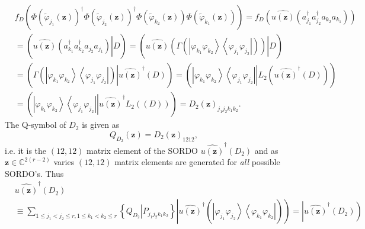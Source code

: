 \documentclass[aps,preprint]{revtex4}%
\begin{document}
\begin{align}
&  f_{D}\left(  \Phi\left(  \tilde{\varphi}_{j_{1}}\left(  \mathbf{z}\right)
\right)  ^{\dagger}\Phi\left(  \tilde{\varphi}_{j_{2}}\left(  \mathbf{z}%
\right)  \right)  ^{\dagger}\Phi\left(  \tilde{\varphi}_{k_{2}}\left(
\mathbf{z}\right)  \right)  \Phi\left(  \tilde{\varphi}_{k_{1}}\left(
\mathbf{z}\right)  \right)  \right)  =f_{D}\left(  \widehat{u\left(
\mathbf{z}\right)  }\left(  a_{j_{1}}^{\dagger}a_{j_{2}}^{\dagger}a_{k_{2}%
}a_{k_{1}}\right)  \right) \nonumber\\
&  =\left(  \left.  \overset{}{\widehat{u\left(  \mathbf{z}\right)  }\left(
a_{k_{1}}^{\dagger}a_{k_{2}}^{\dagger}a_{j_{2}}a_{j_{1}}\right)  }\right\vert
D\right)  =\left(  \left.  \overset{}{\widehat{u\left(  \mathbf{z}\right)
}\left(  \Gamma\left(  \left\vert \varphi_{k_{1}}\varphi_{k_{2}}\right\rangle
\left\langle \varphi_{j_{1}}\varphi_{j_{2}}\right\vert \right)  \right)
}\right\vert D\right) \nonumber\\
&  =\left(  \left.  \overset{}{\Gamma\left(  \left\vert \varphi_{k_{1}}%
\varphi_{k_{2}}\right\rangle \left\langle \varphi_{j_{1}}\varphi_{j_{2}%
}\right\vert \right)  }\right\vert \widehat{u\left(  \mathbf{z}\right)
}^{\dagger}\left(  D\right)  \right)  =\left(  \left.  \overset{}{\left\vert
\varphi_{k_{1}}\varphi_{k_{2}}\right\rangle \left\langle \varphi_{j_{1}%
}\varphi_{j_{2}}\right\vert }\right\vert L_{2}\left(  \widehat{u\left(
\mathbf{z}\right)  }^{\dagger}\left(  D\right)  \right)  \right) \nonumber\\
&  =\left(  \left.  \overset{}{\left\vert \varphi_{k_{1}}\varphi_{k_{2}%
}\right\rangle \left\langle \varphi_{j_{1}}\varphi_{j_{2}}\right\vert
}\right\vert \widehat{u\left(  \mathbf{z}\right)  }^{\dagger}L_{2}\left(
\left(  D\right)  \right)  \right)  =D_{2}\left(  \mathbf{z}\right)
_{j_{1}j_{2}k_{1}k_{2}}.
\end{align}
The Q-symbol of $D_{2}$ is given as
\begin{equation}
Q_{D_{2}}\left(  \mathbf{z}\right)  =D_{2}\left(  \mathbf{z}\right)  _{1212},
\end{equation}
i.e. it is the $\left(  12,12\right)  $ matrix element of the SORDO
$\widehat{u\left(  \mathbf{z}\right)  }^{\dagger}\left(  D_{2}\right)  $ and
as $\mathbf{z\in}\mathbb{C}^{2\left(  r-2\right)  }$ varies $\left(
12,12\right)  $ matrix elements are generated for \emph{all }possible SORDO's.
Thus
\begin{align}
&  \widehat{u\left(  \mathbf{z}\right)  }^{\dagger}\left(  D_{2}\right)
\nonumber\\
&  \equiv\sum_{1\leq j_{1}<j_{2}\leq r,1\leq k_{1}<k_{2}\leq r}\left\{
\left.  \overset{}{Q_{D_{2}}}\right\vert \overset{}{P_{j_{1}j_{2}k_{1}k_{2}}%
}\right\}  \left\vert \widehat{u\left(  \mathbf{z}\right)  }^{\dagger}\left(
\overset{}{\left\vert \varphi_{j_{1}}\varphi_{j_{2}}\right\rangle \left\langle
\varphi_{k_{1}}\varphi_{k_{2}}\right\vert }\right)  \right)  =\left\vert
\widehat{u\left(  \mathbf{z}\right)  }^{\dagger}\left(  D_{2}\right)  \right)
\end{align}
\end{document}
